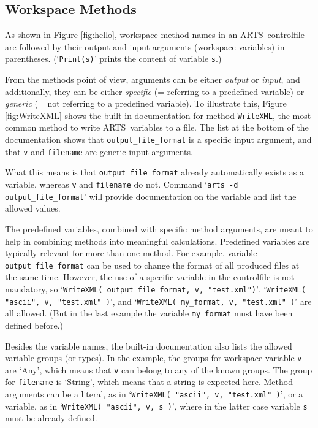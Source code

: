\subsection{Workspace Methods}
%
As shown in Figure \ref{fig:hello}, workspace method names in an ARTS\
controlfile are followed by their output and input arguments (workspace
variables) in parentheses. (`\texttt{Print(s)}' prints the content of variable
\texttt{s}.)

From the methods point of view, arguments can be either \emph{output} or
\emph{input}, and additionally, they can be either \emph{specific} (= referring
to a predefined variable) or \emph{generic} (= not referring to a predefined
variable). To illustrate this, Figure \ref{fig:WriteXML} shows the built-in
documentation for method \texttt{WriteXML}, the most common method to write
ARTS\ variables to a file. The list at the bottom of the documentation shows
that \texttt{output\_file\_format} is a specific input argument, and that
\texttt{v} and \texttt{filename} are generic input arguments.

What this means is that \texttt{output\_file\_format} already automatically
exists as a variable, whereas \texttt{v} and \texttt{filename} do not. Command
`\texttt{arts -d output\_file\_format}' will provide documentation on the
variable and list the allowed values.

The predefined variables, combined with specific method arguments, are meant to
help in combining methods into meaningful calculations. Predefined variables
are typically relevant for more than one method. For example, variable
\texttt{output\_file\_format} can be used to change the format of all produced
files at the same time. However, the use of a specific variable in the
controlfile is not mandatory, so `\texttt{WriteXML( output\_file\_format, v,
  "test.xml")}', `\texttt{WriteXML( "ascii", v, "test.xml" )}', and
`\texttt{WriteXML( my\_format, v, "test.xml" )}' are all allowed. (But in the
last example the variable \texttt{my\_format} must have been defined before.)

Besides the variable names, the built-in documentation also lists the allowed
variable groups (or types). In the example, the groups for workspace variable
\texttt{v} are `Any', which means that \texttt{v} can belong to any of the
known groups. The group for \texttt{filename} is `String', which means that a
string is expected here. Method arguments can be a literal, as in
`\texttt{WriteXML( "ascii", v, "test.xml" )}', or a variable, as in
`\texttt{WriteXML( "ascii", v, s )}', where in the latter case variable
\texttt{s} must be already defined.

